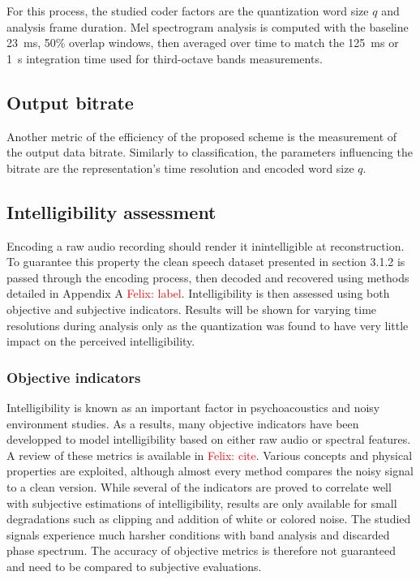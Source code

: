 \documentclass[12pt,times,onecolumn]{article}
\newcommand{\fg}[1]{\textcolor{red}{ Felix: #1}}
\begin{document}
For this process, the studied coder factors are the quantization word size $q$ and analysis frame duration. Mel spectrogram analysis is computed with the baseline 23~ms, 50\% overlap windows, then averaged over time to match the 125~ms or 1~s integration time used for third-octave bands measurements.


\subsection{Output bitrate}

Another metric of the efficiency of the proposed scheme is the measurement of the output data bitrate. Similarly to classification, the parameters influencing the bitrate are the representation's time resolution and encoded word size $q$.


\subsection{Intelligibility assessment}

Encoding a raw audio recording should render it inintelligible at reconstruction. To guarantee this property the clean speech dataset presented in section 3.1.2 is passed through the encoding process, then decoded and recovered using methods detailed in Appendix A \fg{label}. Intelligibility is then assessed using both objective and subjective indicators. Results will be shown for varying time resolutions during analysis only as the quantization was found to have very little impact on the perceived intelligibility.

\subsubsection{Objective indicators}

Intelligibility is known as an important factor in psychoacoustics and noisy environment studies. As a results, many objective indicators have been developped to model intelligibility based on either raw audio or spectral features. A review of these metrics is available in \fg{cite}. Various concepts and physical properties are exploited, although almost every method compares the noisy signal to a clean version. While several of the indicators are proved to correlate well with subjective estimations of intelligibility, results are only available for small degradations such as clipping and addition of white or colored noise. The studied signals experience much harsher conditions with band analysis and discarded phase spectrum. The accuracy of objective metrics is therefore not guaranteed and need to be compared to subjective evaluations.\\
\end{document}
